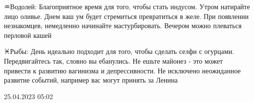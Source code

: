 \documentclass{article}
\begin{document}
\begin{multicols}{3}
♒️Водолей: Благоприятное время для того, чтобы стать индусом. Утром натирайте лицо оливье. Днем ваш ум будет стремиться превратиться в желе. При появлении незнакомцев, немедленно начинайте мастурбировать. Вечером можно плеваться перловой кашей

♓️Рыбы: День идеально подходит для того, чтобы сделать селфи с огурцами. Передвигайтесь так, словно вы ебанулись. Не ешьте майонез - это может привести к развитию вагинизма и депрессивности. Не исключено неожиданное развитие событий, например вас могут принять за Ленина

25.04.2023 05:02\closearticle

\end{multicols}
\end{document}
